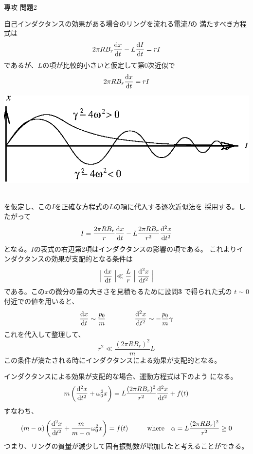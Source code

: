 \documentclass[fleqn]{jbook}
\begin{document}
\begin{answer}{専攻 問題2}{}
\begin{subanswers}
%
\SubAnswer
  \begin{subsubanswers}
  \SubSubAnswer
  \parbox[t]{60mm}{
    自己インダクタンスの効果がある場合のリングを流れる電流$I$の
    満たすべき方程式は
%
    \[ 2\pi R B_r {\frac{{\rm d} x}{{\rm d} t}} - L{\frac{{\rm d} I}{{\rm d} t}} = rI \]
%
    であるが、$L$の項が比較的小さいと仮定して第0次近似で
%
    \[ 2\pi R B_r {\frac{{\rm d} x}{{\rm d} t}} = rI \]
%
  }\parbox[t]{95mm}{
  \begin{center}
     \mbox{\includegraphics[clip]{1995phy2-2.eps}}
  \end{center}}\\
%
    を仮定し、この$I$を正確な方程式の$L$の項に代入する逐次近似法を
    採用する。したがって
%
    \[ I = \frac{2\pi R B_r}{r}{\frac{{\rm d} x}{{\rm d} t}} - L\frac{2\pi R B_r}{r^2}{\frac{{\rm d} ^2x}{{\rm d} t^2}} \]
%
    となる。$I$の表式の右辺第2項はインダクタンスの影響の項である。
    これよりインダクタンスの効果が支配的となる条件は
%
    \[ \Bigm|{\frac{{\rm d} x}{{\rm d} t}}\Bigm| \ll \frac{L}{r}\Bigm|{\frac{{\rm d} ^2x}{{\rm d} t^2}}\Bigm| \]
%
    である。この$x$の微分の量の大きさを見積もるために設問{\bf 3}
    で得られた式の $t \sim 0$ 付近での値を用いると、
%
    \[ \Deriver{x}{t} \sim  \frac{p_0}{m} \hspace{15mm}%
       \Deriver{^2 x}{t^2 } \sim - \frac{p_0}{m} \gamma \]
%
    これを代入して整理して、
%
    \[ r^2 \ll \frac{(2 \pi R B_r)^2 }{m} L \]
%
    この条件が満たされる時にインダクタンスによる効果が支配的となる。


  \SubSubAnswer
    インダクタンスによる効果が支配的な場合、運動方程式は下のよう
    になる。
%
    \[ m \left( \Deriver{^2 x}{t^2} + \omega_0^2 x \right)%
       = L \frac{(2 \pi R B_r)^2 }{r^2 } \Deriver{^2 x}{t^2 } + f(t) \]
%
すなわち、
    \[ ( m - \alpha )\left( \Deriver{^2 x}{t^2} + \frac{m}{m - \alpha } \omega_0^2 x \right) = f(t)%
       \hspace{10mm}%
       {\rm where}\quad \alpha = L \frac{(2 \pi R B_r)^2 }{r^2 } \ge 0 \]  
%
    つまり、リングの質量が減少して固有振動数が増加したと考えることができる。

  \end{subsubanswers}
\end{subanswers}
\end{answer}
\end{document}
